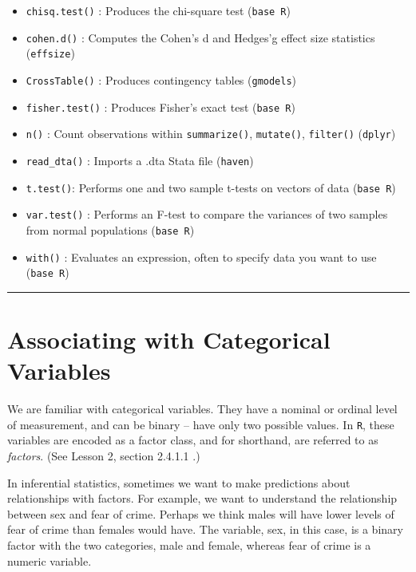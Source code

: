 \documentclass[
]{book}
\providecommand{\tightlist}{%
  \setlength{\itemsep}{0pt}\setlength{\parskip}{0pt}}
\begin{document}
\begin{itemize}
\tightlist
\item
  \texttt{chisq.test()} : Produces the chi-square test (\texttt{base\ R})
\item
  \texttt{cohen.d()} : Computes the Cohen's d and Hedges'g effect size statistics (\texttt{effsize})
\item
  \texttt{CrossTable()} : Produces contingency tables (\texttt{gmodels})
\item
  \texttt{fisher.test()} : Produces Fisher's exact test (\texttt{base\ R})
\item
  \texttt{n()} : Count observations within \texttt{summarize()}, \texttt{mutate()}, \texttt{filter()} (\texttt{dplyr})
\item
  \texttt{read\_dta()} : Imports a .dta Stata file (\texttt{haven})
\item
  \texttt{t.test()}: Performs one and two sample t-tests on vectors of data (\texttt{base\ R})
\item
  \texttt{var.test()} : Performs an F-test to compare the variances of two samples from normal populations (\texttt{base\ R})
\item
  \texttt{with()} : Evaluates an expression, often to specify data you want to use (\texttt{base\ R})
\end{itemize}

\begin{center}\rule{0.5\linewidth}{0.5pt}\end{center}

\hypertarget{associating-with-categorical-variables}{%
\section{Associating with Categorical Variables}\label{associating-with-categorical-variables}}

We are familiar with categorical variables. They have a nominal or ordinal level of measurement, and can be binary -- have only two possible values. In \texttt{R}, these variables are encoded as a factor class, and for shorthand, are referred to as \emph{factors}. (See Lesson 2, section 2.4.1.1 .)

In inferential statistics, sometimes we want to make predictions about relationships with factors. For example, we want to understand the relationship between sex and fear of crime. Perhaps we think males will have lower levels of fear of crime than females would have. The variable, sex, in this case, is a binary factor with the two categories, male and female, whereas fear of crime is a numeric variable.
\end{document}
